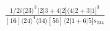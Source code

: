 \documentclass[varwidth, border=5pt]{standalone}
\begin{document}
\begin{my}
$\begin{gathered}
\scriptscriptstyle\frac{1/2i\langle23\rangle^3\langle2|3+4|2]\langle4|2+3|1]^3}{[16]\langle24\rangle^4\langle34\rangle[56]\langle2|1+6|5]s_{234}}
\end{gathered}$
\end{my}
\end{document}
